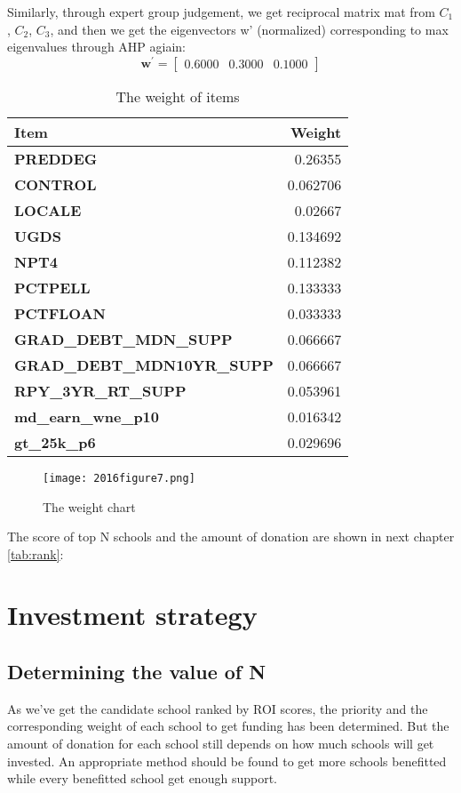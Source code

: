 Similarly, through expert group judgement, we get reciprocal matrix mat from $C_1$, $C_2$, $C_3$, and then we get the eigenvectors w' (normalized) corresponding to max eigenvalues through AHP agiain:
\begin{equation}
	\boldsymbol{w^{'}} = \begin{bmatrix}
0.6000 & 0.3000 & 0.1000
\end{bmatrix}
\end{equation}
\begin{table}[htbp]
  \centering
  \caption{The weight of items}
    \begin{tabular}{lr}
    \toprule
    \textbf{Item} & Weight \\
    \midrule
    \textbf{PREDDEG} & 0.26355 \\
    \textbf{CONTROL} & 0.062706 \\
    \textbf{LOCALE} & 0.02667 \\
    \textbf{UGDS} & 0.134692 \\
    \textbf{NPT4} & 0.112382 \\
    \textbf{PCTPELL} & 0.133333 \\
    \textbf{PCTFLOAN} & 0.033333 \\
    \textbf{GRAD\_DEBT\_MDN\_SUPP} & 0.066667 \\
    \textbf{GRAD\_DEBT\_MDN10YR\_SUPP} & 0.066667 \\
    \textbf{RPY\_3YR\_RT\_SUPP} & 0.053961 \\
    \textbf{md\_earn\_wne\_p10} & 0.016342 \\
    \textbf{gt\_25k\_p6} & 0.029696 \\
    \bottomrule
    \end{tabular}%
  \label{tab:item}%
\end{table}%

  \begin{figure}[h]
      \texttt{[image: 2016figure7.png]}
      \caption{The weight chart}\label{fig:weight}
    \end{figure}
The score of top N schools and the amount of donation are shown in next chapter \autoref{tab:rank}:




\section{Investment strategy}
	\subsection{Determining the value of N}
	As we've get the candidate school ranked by ROI scores, the priority and the corresponding weight of each school to get funding has been determined. But the amount of donation for each school still depends on how much schools will get invested. An appropriate method should be found to get more schools benefitted while every benefitted school get enough support.

